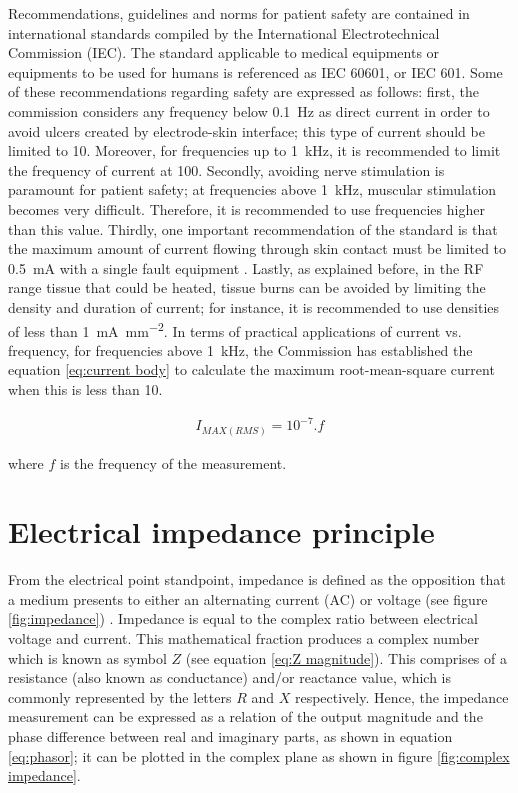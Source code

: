 Recommendations, guidelines and norms for patient safety are contained in international standards compiled by the International Electrotechnical Commission (IEC). The standard applicable to medical equipments or equipments to be used for humans is referenced as IEC 60601, or IEC 601. Some of these recommendations regarding safety are expressed as follows: first, the commission considers any frequency below \SI{0.1}{\hertz} as direct current in order to avoid ulcers created by electrode-skin interface; this type of current should be limited to \SI{10}{\uArms}. Moreover, for frequencies up to \SI{1}{\kilo\hertz}, it is recommended to limit the frequency of current at \SI{100}{\uArms}. Secondly, avoiding nerve stimulation is paramount for patient safety; at frequencies above \SI{1}{\kilo\hertz}, muscular stimulation becomes very difficult. Therefore, it is recommended to use frequencies higher than this value. Thirdly, one important recommendation of the standard is that the maximum amount of current flowing through skin contact must be limited to \SI{0.5}{\milli\ampere} with a single fault equipment . Lastly, as explained before, in the RF range tissue that could be heated, tissue burns can be avoided by limiting the density and duration of current; for instance, it is recommended to use densities of less than \SI{1}{\milli\ampere\per\milli\meter\squared}. In terms of practical applications of current vs. frequency, for frequencies above \SI{1}{\kilo\hertz}, the Commission has established the equation \ref{eq:current body} to calculate the maximum root-mean-square current when this is less than \SI{10}{\mArms}.

\begin{align}
	\label{eq:current body}
	I_{MAX(RMS)} = 10^{-7}.f
\end{align}

where $f$ is the frequency of the measurement.

\section{Electrical impedance principle}
\label{section impedance principle}
From the electrical point standpoint, impedance is defined as the opposition that a medium presents to either an alternating current (AC) or voltage (see figure \ref{fig:impedance}) \cite{callegaro2012electrical}. Impedance is equal to the complex ratio between electrical voltage and current. This mathematical fraction produces a complex number which is known as symbol $Z$ (see equation \ref{eq:Z magnitude}). This comprises of a resistance (also known as conductance) and/or reactance value, which is commonly represented by the letters $R$ and $X$ respectively. Hence, the impedance measurement can be expressed as a relation of the output magnitude and the phase difference between real and imaginary parts, as shown in equation \ref{eq:phasor}; it can be plotted in the complex plane as shown in figure \ref{fig:complex impedance}.

